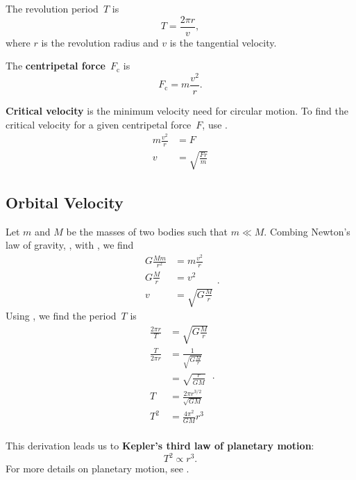 The revolution period~\(T\) is
\begin{equation} \label{eq:revolution-period}
    T = \frac{2 \pi r}{v},
\end{equation}
where \(r\) is the revolution radius and \(v\) is the tangential velocity.

The \textbf{centripetal force}~\(F_\mathrm{c}\) is
\begin{equation} \label{eq:centripetal-force}
    F_\mathrm{c} = m \frac{v^2}{r}.
\end{equation}

\textbf{Critical velocity} is the minimum velocity need for circular motion.
To find the critical velocity for a given centripetal force~\(F\),
use .
\begin{equation}
    \begin{aligned}
        m \frac{v^2}{r} &= F \\
        v &= \sqrt{\frac{F r}{m}}
    \end{aligned}
\end{equation}

\subsection{Orbital Velocity} \label{subsec:orbital-velocity}

Let \(m\) and \(M\) be the masses of two bodies such that \(m \ll M\).
Combing Newton's law of gravity,
,
with , we find
\begin{equation}
    \begin{aligned}
        G \frac{M m}{r^2} &= m \frac{v^2}{r} \\
        G \frac{M}{r} &= v^2 \\
        v &= \sqrt{G \frac{M}{r}}
    \end{aligned}.
\end{equation}
Using , we find the period~\(T\) is
\begin{equation}
    \begin{aligned}
        \frac{2 \pi r}{T} &= \sqrt{G \frac{M}{r}} \\
        \frac{T}{2 \pi r} &= \frac{1}{\sqrt{G \frac{M}{r}}} \\
        &= \sqrt{\frac{r}{G M}} \\
        T &= \frac{2 \pi r^{3/2}}{\sqrt{G M}} \\
        T^2 &= \frac{4 \pi^2}{G M} r^3 \\
    \end{aligned}.
\end{equation}

This derivation leads us to \textbf{Kepler's third law of planetary motion}:
\begin{equation} \label{eq:kepler-3rd-law}
    T^2 \propto r^3.
\end{equation}
For more details on planetary motion, see .

